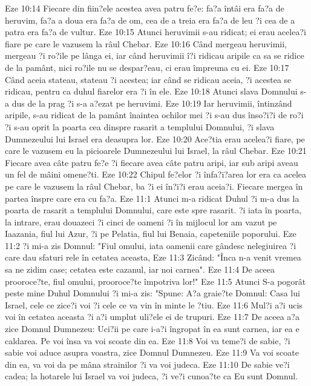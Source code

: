 Eze 10:14  Fiecare din fiin?ele acestea avea patru fe?e: fa?a întâi era fa?a de heruvim, fa?a a doua era fa?a de om, cea de a treia era fa?a de leu ?i cea de a patra era fa?a de vultur.
Eze 10:15  Atunci heruvimii s-au ridicat; ei erau acelea?i fiare pe care le vazusem la râul Chebar.
Eze 10:16  Când mergeau heruvimii, mergeau ?i ro?ile pe lânga ei, iar când heruvimii î?i ridicau aripile ca sa se ridice de la pamânt, nici ro?ile nu se despar?eau, ci erau împreuna cu ei.
Eze 10:17  Când aceia stateau, stateau ?i acestea; iar când se ridicau aceia, ?i acestea se ridicau, pentru ca duhul fiarelor era ?i în ele.
Eze 10:18  Atunci slava Domnului s-a dus de la prag ?i s-a a?ezat pe heruvimi.
Eze 10:19  Iar heruvimii, întinzând aripile, s-au ridicat de la pamânt înaintea ochilor mei ?i s-au dus înso?i?i de ro?i ?i s-au oprit la poarta cea dinspre rasarit a templului Domnului, ?i slava Dumnezeului lui Israel era deasupra lor.
Eze 10:20  Ace?tia erau acelea?i fiare, pe care le vazusem eu la picioarele Dumnezeului lui Israel, la râul Chebar.
Eze 10:21  Fiecare avea câte patru fe?e ?i fiecare avea câte patru aripi, iar sub aripi aveau un fel de mâini omene?ti.
Eze 10:22  Chipul fe?elor ?i înfa?i?area lor era ca acelea pe care le vazusem la râul Chebar, ba ?i ei în?i?i erau aceia?i. Fiecare mergea în partea înspre care era cu fa?a.
Eze 11:1  Atunci m-a ridicat Duhul ?i m-a dus la poarta de rasarit a templului Domnului, care este spre rasarit. ?i iata în poarta, la intrare, erau douazeci ?i cinci de oameni ?i în mijlocul lor am vazut pe Iaazania, fiul lui Azur, ?i pe Pelatia, fiul lui Benaia, capeteniile poporului.
Eze 11:2  ?i mi-a zis Domnul: "Fiul omului, iata oamenii care gândesc nelegiuirea ?i care dau sfaturi rele în cetatea aceasta,
Eze 11:3  Zicând: "Înca n-a venit vremea sa ne zidim case; cetatea este cazanul, iar noi carnea".
Eze 11:4  De aceea prooroce?te, fiul omului, prooroce?te împotriva lor!"
Eze 11:5  Atunci S-a pogorât peste mine Duhul Domnului ?i mi-a zis: "Spune: A?a graie?te Domnul: Casa lui Israel, cele ce zice?i voi ?i cele ce va vin în minte le ?tiu.
Eze 11:6  Mul?i a?i ucis voi în cetatea aceasta ?i a?i umplut uli?ele ei de trupuri.
Eze 11:7  De aceea a?a zice Domnul Dumnezeu: Uci?ii pe care i-a?i îngropat în ea sunt carnea, iar ea e caldarea. Pe voi însa va voi scoate din ea.
Eze 11:8  Voi va teme?i de sabie, ?i sabie voi aduce asupra voastra, zice Domnul Dumnezeu.
Eze 11:9  Va voi scoate din ea, va voi da pe mâna strainilor ?i va voi judeca.
Eze 11:10  De sabie ve?i cadea; la hotarele lui Israel va voi judeca, ?i ve?i cunoa?te ca Eu sunt Domnul.
